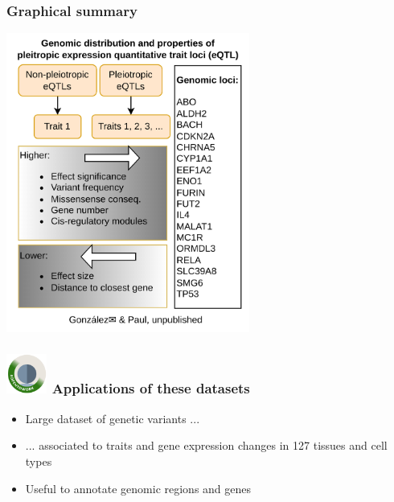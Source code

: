 \documentclass{beamer}
\newcounter{frame}[frame]
\begin{document}
    \begin{frame}
        \frametitle{Graphical summary}

        \begin{center}
            \includegraphics[width=0.6\textwidth]{fig/graphical_abstract.drawio.png}
        \end{center}

    \end{frame}

    \begin{frame}
        \frametitle{\includegraphics[width=0.1\textwidth]{fig/opentonetwork.png} Applications of these datasets}

        \begin{itemize}
            \item Large dataset of genetic variants ...
            \item ... associated to traits and gene expression changes in 127 tissues and cell types
            \item Useful to annotate genomic regions and genes
        \end{itemize}

    \end{frame}
\end{document}

